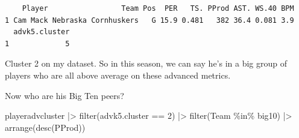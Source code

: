 \documentclass[
  letterpaper,
  DIV=11,
  numbers=noendperiod]{scrreprt}
\newenvironment{Shaded}{\begin{snugshade}}{\end{snugshade}}
\newcommand{\DecValTok}[1]{\textcolor[rgb]{0.68,0.00,0.00}{#1}}
\newcommand{\FunctionTok}[1]{\textcolor[rgb]{0.28,0.35,0.67}{#1}}
\newcommand{\NormalTok}[1]{\textcolor[rgb]{0.00,0.23,0.31}{#1}}
\newcommand{\SpecialCharTok}[1]{\textcolor[rgb]{0.37,0.37,0.37}{#1}}
\begin{document}
\begin{verbatim}
    Player                 Team Pos  PER   TS. PProd AST. WS.40 BPM
1 Cam Mack Nebraska Cornhuskers   G 15.9 0.481   382 36.4 0.081 3.9
  advk5.cluster
1             5
\end{verbatim}

Cluster 2 on my dataset. So in this season, we can say he's in a big
group of players who are all above average on these advanced metrics.

Now who are his Big Ten peers?

\begin{Shaded}
\begin{Highlighting}[]
\NormalTok{playeradvcluster }\SpecialCharTok{|\textgreater{}} 
  \FunctionTok{filter}\NormalTok{(advk5.cluster }\SpecialCharTok{==} \DecValTok{2}\NormalTok{) }\SpecialCharTok{|\textgreater{}} 
  \FunctionTok{filter}\NormalTok{(Team }\SpecialCharTok{\%in\%}\NormalTok{ big10) }\SpecialCharTok{|\textgreater{}} 
  \FunctionTok{arrange}\NormalTok{(}\FunctionTok{desc}\NormalTok{(PProd))}
\end{Highlighting}
\end{Shaded}
\end{document}
